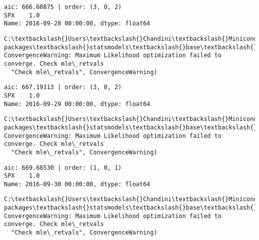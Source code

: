 \documentclass[11pt]{article}
\begin{document}
    \begin{Verbatim}[commandchars=\\\{\}]
aic: 666.60875 | order: (3, 0, 2)
SPX    1.0
Name: 2016-09-28 00:00:00, dtype: float64

    \end{Verbatim}

    \begin{Verbatim}[commandchars=\\\{\}]
C:\textbackslash{}Users\textbackslash{}Chandini\textbackslash{}Miniconda3\textbackslash{}envs\textbackslash{}auquan\textbackslash{}lib\textbackslash{}site-packages\textbackslash{}statsmodels\textbackslash{}base\textbackslash{}model.py:496: ConvergenceWarning: Maximum Likelihood optimization failed to converge. Check mle\_retvals
  "Check mle\_retvals", ConvergenceWarning)

    \end{Verbatim}

    \begin{Verbatim}[commandchars=\\\{\}]
aic: 667.19113 | order: (3, 0, 2)
SPX    1.0
Name: 2016-09-29 00:00:00, dtype: float64

    \end{Verbatim}

    \begin{Verbatim}[commandchars=\\\{\}]
C:\textbackslash{}Users\textbackslash{}Chandini\textbackslash{}Miniconda3\textbackslash{}envs\textbackslash{}auquan\textbackslash{}lib\textbackslash{}site-packages\textbackslash{}statsmodels\textbackslash{}base\textbackslash{}model.py:496: ConvergenceWarning: Maximum Likelihood optimization failed to converge. Check mle\_retvals
  "Check mle\_retvals", ConvergenceWarning)

    \end{Verbatim}

    \begin{Verbatim}[commandchars=\\\{\}]
aic: 669.68530 | order: (1, 0, 1)
SPX    1.0
Name: 2016-09-30 00:00:00, dtype: float64

    \end{Verbatim}

    \begin{Verbatim}[commandchars=\\\{\}]
C:\textbackslash{}Users\textbackslash{}Chandini\textbackslash{}Miniconda3\textbackslash{}envs\textbackslash{}auquan\textbackslash{}lib\textbackslash{}site-packages\textbackslash{}statsmodels\textbackslash{}base\textbackslash{}model.py:496: ConvergenceWarning: Maximum Likelihood optimization failed to converge. Check mle\_retvals
  "Check mle\_retvals", ConvergenceWarning)

    \end{Verbatim}
\end{document}

